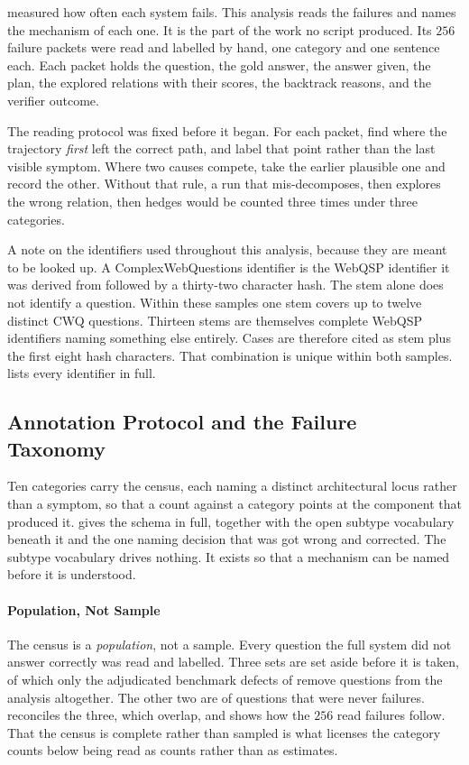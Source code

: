  measured how often each system fails. This analysis reads the
failures and names the mechanism of each one. It is the part of the work no
script produced. Its $256$ failure packets were read and labelled by hand, one
category and one sentence each. Each packet holds the question, the gold answer,
the answer given, the plan, the explored relations with their scores, the
backtrack reasons, and the verifier outcome.

The reading protocol was fixed before it began. For each packet, find where the
trajectory \emph{first} left the correct path, and label that point rather than
the last visible symptom. Where two causes compete, take the earlier plausible
one and record the other. Without that rule, a run that mis-decomposes, then
explores the wrong relation, then hedges would be counted three times under
three categories.

A note on the identifiers used throughout this analysis, because they are meant
to be looked up. A ComplexWebQuestions identifier is the WebQSP identifier it
was derived from followed by a thirty-two character hash. The stem alone does
not identify a question. Within these samples one stem covers up to twelve
distinct CWQ questions. Thirteen stems are themselves complete WebQSP
identifiers naming something else entirely. Cases are therefore cited as stem
plus the first eight hash characters. That combination is unique within both
samples.  lists every identifier in full.

\subsection{Annotation Protocol and the Failure Taxonomy}\label{sec:taxonomy}

Ten categories carry the census, each naming a distinct architectural locus
rather than a symptom, so that a count against a category points at the
component that produced it.  gives the schema in full,
together with the open subtype vocabulary beneath it and the one naming decision
that was got wrong and corrected. The subtype vocabulary drives nothing. It
exists so that a mechanism can be named before it is understood.

\paragraph{Population, Not Sample}

The census is a \emph{population}, not a sample. Every
question the full system did not answer correctly was read and labelled. Three
sets are set aside before it is taken, of which only the adjudicated benchmark
defects of  remove questions from the analysis
altogether. The other two are of questions that were never failures.
 reconciles the three, which overlap, and shows how
the $256$ read failures follow. That the census is complete rather than sampled
is what licenses the category counts below being read as counts rather than as
estimates.

